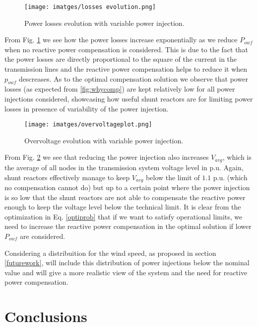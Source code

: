 \documentclass[a4paper,11pt, titlepage, twoside]{article}
\begin{document}
\begin{figure}[H]
    \centering
    \texttt{[image: imatges/losses evolution.png]}
    \caption{Power losses evolution with variable power injection.}
    \label{fig:lossesevol}
\end{figure}

From Fig. \ref{fig:lossesevol} we see how the power losses increase exponentially as we reduce $P_{owf}$ when no reactive power
compensation is considered. This is due to the fact that the power losses are directly proportional to the square of the current in the transmission lines and the reactive power compensation helps to reduce it when $p_{owf}$ descreases.
As to the optimal compensation solution we observe that power losses (as expected from \ref{fig:whycomp}) are kept relatively low for all power injections considered, showcasing how useful shunt reactors are for limiting power losses in presence of variability of
the power injection.
\begin{figure}[H]
    \centering
    \texttt{[image: imatges/overvoltageplot.png]}
    \caption{Overvoltage evolution with variable power injection.}
    \label{fig:overvoltevol}
\end{figure}

From Fig. \ref{fig:overvoltevol} we see that reducing the power injection also increases $V_{avg}$, which is the average of all nodes in the transmission system voltage level in p.u. Again, shunt reactors effectively manage to keep $V_{avg}$ below the limit of $1.1$ p.u. (which no compensation cannot do) but up to a certain point where the power injection is so low that the shunt reactors are not able to compensate the reactive power enough to keep the voltage level below the technical limit. It
is clear from the optimization in Eq. \ref{optiprob} that if we want to satisfy operational limits, we need to increase the reactive power compensation in the optimal solution if lower $P_{owf}$ are considered.

Considering a distribuition for the wind speed, as proposed in section \ref{futurework}, will include this distribution of power injections below the nominal value and will give a more realistic view of the system and the need for reactive power compensation.


\section{Conclusions}\label{Conclusions}
\end{document}
